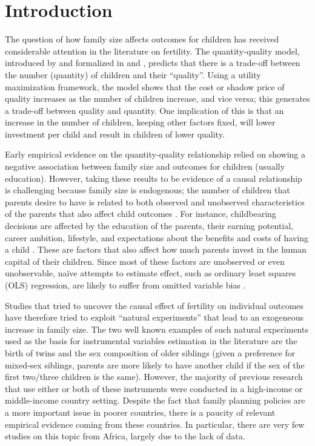 
\section{Introduction}

The question of how family size affects outcomes for children has received considerable attention in the literature on fertility. The quantity-quality model, introduced by \textcite{Becker1960} and formalized in \textcite{Becker1973} and \textcite{Becker1976}, predicts that there is a trade-off between the number (quantity) of children and their “quality”. Using a utility maximization framework, the model shows that the cost or shadow price of quality increases as the number of children increase, and vice versa; this generates a trade-off between quality and quantity. One implication of this is that an increase in the number of children, keeping other factors fixed, will lower investment per child and result in children of lower quality.

Early empirical evidence on the quantity-quality relationship relied on showing a negative association between family size and outcomes for children (usually education).  However, taking these results to be evidence of a causal relationship is challenging because family size is endogenous; the number of children that parents desire to have is related to both observed and unobserved characteristics of the parents that also affect child outcomes \parencite{Black2010}. For instance, childbearing decisions are affected by the education of the parents, their earning potential, career ambition, lifestyle, and expectations about the benefits and costs of having a child \parencite{Angrist2006,oberg_casual_2021}. These are factors that also affect how much parents invest in the human capital of their children. Since most of these factors are unobserved or even unobservable, naïve attempts to estimate effect, such as ordinary least squares (OLS) regression, are likely to suffer from omitted variable bias \parencite{oberg_casual_2021}.

Studies that tried to uncover the causal effect of fertility on individual outcomes have therefore tried to exploit “natural experiments” that lead to an exogeneous increase in family size. The two well known examples of such natural experiments used as the basis for instrumental variables estimation in the literature are the birth of twins and the sex composition of older siblings (given a preference for mixed-sex siblings, parents are more likely to have another child if the sex of the first two/three children is the same). However, the majority of previous research that use either or both of these instruments were conducted in a high-income or middle-income country setting. Despite the fact that family planning policies are a more important issue in poorer countries, there is a paucity of relevant empirical evidence coming from these countries. In particular, there are very few studies on this topic from Africa, largely due to the lack of data. 

